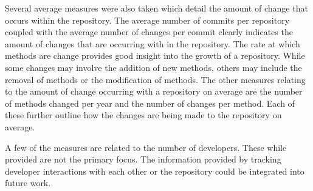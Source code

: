 Several average measures were also taken which detail the amount of change that occurs within the repository. The average number of commits per repository coupled with the average number of changes per commit clearly indicates the amount of changes that are occurring with in the repository. The rate at which methods are change provides good insight into the growth of a repository. While some changes may involve the addition of new methods, others may include the removal of methods or the modification of methods. The other measures relating to the amount of change occurring with a repository on average are the number of methods changed per year and the number of changes per method. Each of these further outline how the changes are being made to the repository on average.

A few of the measures are related to the number of developers. These while provided are not the primary focus. The information provided by tracking developer interactions with each other or the repository could be integrated into future work.

